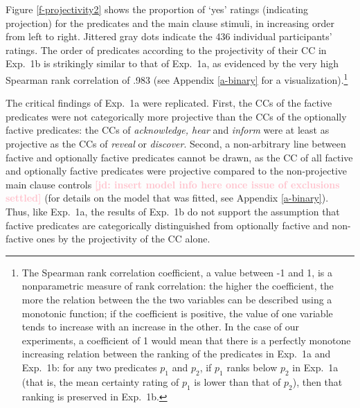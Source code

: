 \documentclass[11pt,fleqn]{article}
\newcommand{\jd}[1]{\textbf{\textcolor{Pink}{[jd: #1]}}}
\newcommand{\6}{\mbox{$[\hspace*{-.6mm}[$}}
\newcommand{\9}{\mbox{$]\hspace*{-.6mm}]$}}
\begin{document}
Figure \ref{f-projectivity2} shows the proportion of `yes' ratings (indicating projection) for the predicates and the main clause stimuli, in increasing order from left to right. Jittered gray dots indicate the 436 individual participants' ratings. The order of predicates according to the projectivity of their CC in Exp.~1b is strikingly similar to that of Exp.~1a, as evidenced by the very high Spearman rank correlation of .983 (see Appendix \ref{a-binary} for a visualization).\footnote{The Spearman rank correlation coefficient, a value between -1 and 1, is a nonparametric measure of rank correlation: the higher the coefficient, the more the relation between the the two variables can be described using a monotonic function; if the coefficient is positive, the value of one variable tends to increase with an increase in the other. In the case of our experiments, a coefficient of 1 would mean that there is a perfectly monotone increasing relation between the ranking of the predicates in Exp.~1a and Exp.~1b: for any two predicates $p_1$ and $p_2$, if $p_1$ ranks below $p_2$ in Exp.~1a (that is, the mean certainty rating of $p_1$ is lower than that of $p_2$), then that ranking is preserved in Exp.~1b.} 

The critical findings of Exp.~1a were replicated. First, the CCs of the factive predicates were not categorically more projective than the CCs of the optionally factive predicates:  the CCs of {\em acknowledge, hear} and {\em inform} were at least as projective as the CCs of {\em reveal} or {\em discover}. Second, a non-arbitrary line between factive and optionally factive predicates cannot be drawn, as the CC of all factive and optionally factive predicates were projective compared to the non-projective main clause controls \jd{insert model info here once issue of exclusions settled} (for details on the model that was fitted, see Appendix \ref{a-binary}). Thus, like Exp.~1a, the results of Exp.~1b do not support the assumption that factive predicates are categorically distinguished from optionally factive and non-factive ones by the projectivity of the CC alone. 
\end{document}
